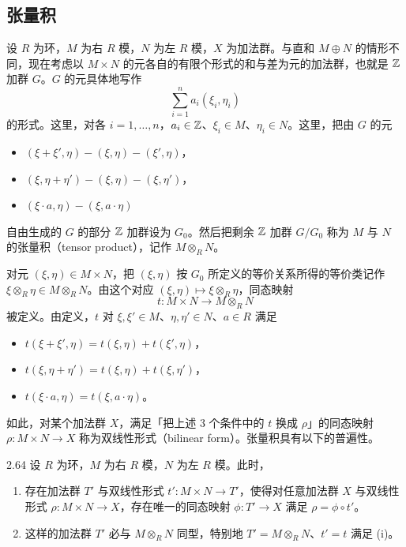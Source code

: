 \subsection{张量积}

设 $R$ 为环，$M$ 为右 $R$ 模，$N$ 为左 $R$ 模，$X$ 为加法群。与直和 $M\oplus N$ 的情形不同，现在考虑以 $M\times N$ 的元各自的有限个形式的和与差为元的加法群，也就是 $\mathbb{Z}$ 加群 $G$。$G$ 的元具体地写作
\[
  \sum_{i=1}^n a_i(\xi_i,\eta_i)
\]
的形式。这里，对各 $i=1,\ldots,n$，$a_i\in\mathbb{Z}$、$\xi_i\in M$、$\eta_i\in N$。这里，把由 $G$ 的元
\begin{itemize}
  \item $(\xi+\xi',\eta)-(\xi,\eta)-(\xi',\eta)$，
  \item $(\xi,\eta+\eta')-(\xi,\eta)-(\xi,\eta')$，
  \item $(\xi\cdot a,\eta)-(\xi,a\cdot\eta)$
\end{itemize}
自由生成的 $G$ 的部分 $\mathbb{Z}$ 加群设为 $G_0$。然后把剩余 $\mathbb{Z}$ 加群 $G/G_0$ 称为 $M$ 与 $N$ 的张量积（tensor product），记作 $M\otimes_R N$。

对元 $(\xi,\eta)\in M\times N$，把 $(\xi,\eta)$ 按 $G_0$ 所定义的等价关系所得的等价类记作 $\xi\otimes_R\eta\in M\otimes_R N$。由这个对应 $(\xi,\eta)\mapsto\xi\otimes_R\eta$，同态映射
\[
  t\colon M\times N\to M\otimes_R N
\]
被定义。由定义，$t$ 对 $\xi,\xi'\in M$、$\eta,\eta'\in N$、$a\in R$ 满足
\begin{itemize}
  \item $t(\xi+\xi',\eta)=t(\xi,\eta)+t(\xi',\eta)$，
  \item $t(\xi,\eta+\eta')=t(\xi,\eta)+t(\xi,\eta')$，
  \item $t(\xi\cdot a,\eta)=t(\xi,a\cdot\eta)$。
\end{itemize}

如此，对某个加法群 $X$，满足「把上述 3 个条件中的 $t$ 换成 $\rho$」的同态映射 $\rho\colon M\times N\to X$ 称为双线性形式（bilinear form）。张量积具有以下的普遍性。

\begin{proposition}{2.64} 设 $R$ 为环，$M$ 为右 $R$ 模，$N$ 为左 $R$ 模。此时，
\begin{enumerate}[label=(\roman*), leftmargin=*]
  \item 存在加法群 $T'$ 与双线性形式 $t'\colon M\times N\to T'$，使得对任意加法群 $X$ 与双线性形式 $\rho\colon M\times N\to X$，存在唯一的同态映射 $\phi\colon T'\to X$ 满足 $\rho=\phi\circ t'$。
  \item 这样的加法群 $T'$ 必与 $M\otimes_R N$ 同型，特别地 $T'=M\otimes_R N$、$t'=t$ 满足 (i)。
\end{enumerate}
\end{proposition}

